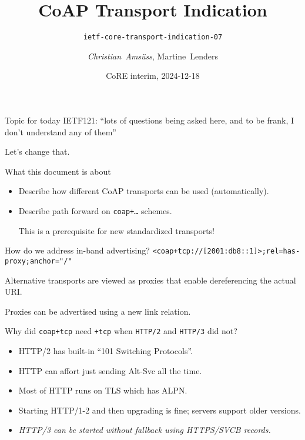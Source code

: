 

\title{CoAP Transport Indication}
\subtitle{\texttt{ietf-core-transport-indication-07}}
\author{\textit{Christian~Amsüss}, Martine~Lenders}
\date{CoRE interim, 2024-12-18}



\frame{\titlepage}

\begin{frame}{Topic for today}\Large
    IETF121: ``lots of questions being asked here, and to be frank, I don't understand any of them''

    \vspace{2cm}

    Let's change that.
\end{frame}

\begin{frame}{What this document is about}\Large
    \begin{itemize}
        \item {\color{gray} Describe how different CoAP transports can be used (automatically).}
        \item Describe path forward on \texttt{coap+…} schemes.

            \bigskip

            This is a prerequisite for new standardized transports!
    \end{itemize}
\end{frame}

\begin{frame}{How do we address in-band advertising?}\Large
    \texttt{<coap+tcp://[2001:db8::1]>;rel=has-proxy;anchor="/"}

    \bigskip

    Alternative transports are viewed as proxies that enable dereferencing the actual URI.

    \bigskip

    Proxies can be advertised using a new link relation.
\end{frame}

\begin{frame}{Why did \texttt{coap+tcp} need \texttt{+tcp} when \texttt{HTTP/2} and \texttt{HTTP/3} did not?}\Large
    \begin{itemize}
        \item HTTP/2 has built-in ``101 Switching Protocols''.
        \item HTTP can affort just sending Alt-Svc all the time.
        \item Most of HTTP runs on TLS which has ALPN.
        \item Starting HTTP/1-2 and then upgrading is fine; servers support older versions.
        \item \textit{HTTP/3 can be started without fallback using  HTTPS/SVCB records.}
    \end{itemize}
\end{frame}

